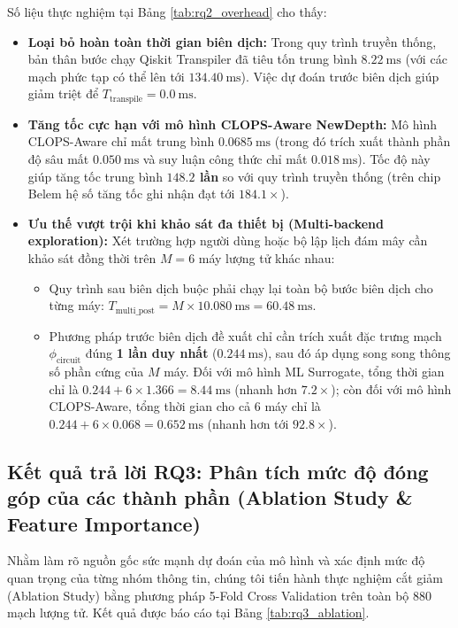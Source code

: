 \documentclass[11pt, a4paper]{article}
\begin{document}
Số liệu thực nghiệm tại Bảng \ref{tab:rq2_overhead} cho thấy:
\begin{itemize}
    \item \textbf{Loại bỏ hoàn toàn thời gian biên dịch:} Trong quy trình truyền thống, bản thân bước chạy Qiskit Transpiler đã tiêu tốn trung bình $8.22~\text{ms}$ (với các mạch phức tạp có thể lên tới $134.40~\text{ms}$). Việc dự đoán trước biên dịch giúp giảm triệt để $T_{\text{transpile}} = 0.0~\text{ms}$.
    \item \textbf{Tăng tốc cực hạn với mô hình CLOPS-Aware NewDepth:} Mô hình CLOPS-Aware chỉ mất trung bình $0.0685~\text{ms}$ (trong đó trích xuất thành phần độ sâu mất $0.050~\text{ms}$ và suy luận công thức chỉ mất $0.018~\text{ms}$). Tốc độ này giúp tăng tốc trung bình \textbf{$148.2$ lần} so với quy trình truyền thống (trên chip Belem hệ số tăng tốc ghi nhận đạt tới \textbf{$184.1\times$}).
    \item \textbf{Ưu thế vượt trội khi khảo sát đa thiết bị (Multi-backend exploration):} Xét trường hợp người dùng hoặc bộ lập lịch đám mây cần khảo sát đồng thời trên $M = 6$ máy lượng tử khác nhau:
    \begin{itemize}
        \item Quy trình sau biên dịch buộc phải chạy lại toàn bộ bước biên dịch cho từng máy: $T_{\text{multi\_post}} = M \times 10.080~\text{ms} = 60.48~\text{ms}$.
        \item Phương pháp trước biên dịch đề xuất chỉ cần trích xuất đặc trưng mạch $\phi_{\text{circuit}}$ đúng \textbf{1 lần duy nhất} ($0.244~\text{ms}$), sau đó áp dụng song song thông số phần cứng của $M$ máy. Đối với mô hình ML Surrogate, tổng thời gian chỉ là $0.244 + 6 \times 1.366 = 8.44~\text{ms}$ (nhanh hơn $7.2\times$); còn đối với mô hình CLOPS-Aware, tổng thời gian cho cả 6 máy chỉ là $0.244 + 6 \times 0.068 = 0.652~\text{ms}$ (nhanh hơn tới \textbf{$92.8\times$}).
    \end{itemize}
\end{itemize}

\subsection{Kết quả trả lời RQ3: Phân tích mức độ đóng góp của các thành phần (Ablation Study \& Feature Importance)}
Nhằm làm rõ nguồn gốc sức mạnh dự đoán của mô hình và xác định mức độ quan trọng của từng nhóm thông tin, chúng tôi tiến hành thực nghiệm cắt giảm (Ablation Study) bằng phương pháp 5-Fold Cross Validation trên toàn bộ 880 mạch lượng tử. Kết quả được báo cáo tại Bảng \ref{tab:rq3_ablation}.
\end{document}
